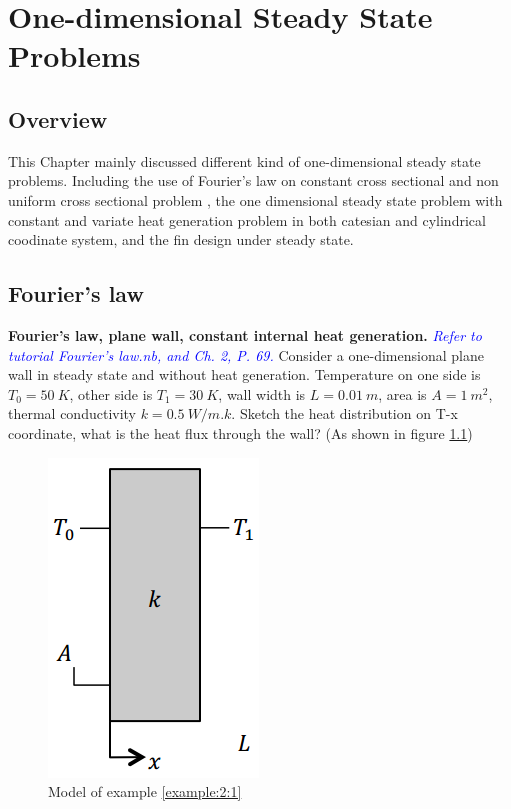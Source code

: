 \newtheorem{problem}{Problem}[section]

\chapter{One-dimensional Steady State Problems}

\section{Overview}
This Chapter mainly discussed different kind of one-dimensional steady state problems. Including the use of Fourier’s law on constant cross sectional and non uniform cross sectional problem , the one dimensional steady state problem with constant and variate heat generation problem in both catesian and cylindrical coodinate system, and the fin design under steady state.

\section{Fourier's law}

\begin{example}
\label{example:2:1}
\textbf{Fourier’s law, plane wall, constant internal heat
generation.} \textcolor{blue} {\emph{Refer to tutorial Fourier’s
law.nb, and Ch. 2, P. 69.}} Consider a one-dimensional plane wall in steady state and without heat generation.
Temperature on one side is $T_0=50~K$, other side is $T_1=30~K$, wall width is $L=0.01~m$,
area is $A=1~m^2$, thermal conductivity $k=0.5~W/m.k$. Sketch the heat distribution on T-x coordinate,
what is the heat flux  through the wall? (As shown in figure \ref{fig:2:1})
\begin{figure}[h!]
  \centering
    \includegraphics[scale=0.6]{figures/ch2/1}
    \caption{Model of example \ref{example:2:1}}
    \label{fig:2:1}
\end{figure}
\end{example}

